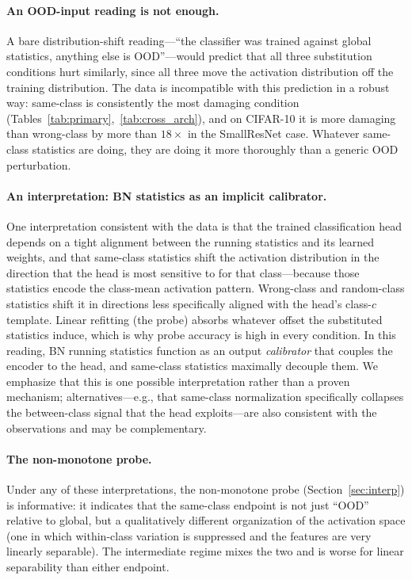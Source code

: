 \documentclass{article}
\begin{document}
\paragraph{An OOD-input reading is not enough.} A bare distribution-shift reading---``the classifier was trained against global statistics, anything else is OOD''---would predict that all three substitution conditions hurt similarly, since all three move the activation distribution off the training distribution. The data is incompatible with this prediction in a robust way: same-class is consistently the most damaging condition (Tables~\ref{tab:primary},~\ref{tab:cross_arch}), and on CIFAR-10 it is more damaging than wrong-class by more than $18\times$ in the SmallResNet case. Whatever same-class statistics are doing, they are doing it more thoroughly than a generic OOD perturbation.

\paragraph{An interpretation: BN statistics as an implicit calibrator.} One interpretation consistent with the data is that the trained classification head depends on a tight alignment between the running statistics and its learned weights, and that same-class statistics shift the activation distribution in the direction that the head is most sensitive to for that class---because those statistics encode the class-mean activation pattern. Wrong-class and random-class statistics shift it in directions less specifically aligned with the head's class-$c$ template. Linear refitting (the probe) absorbs whatever offset the substituted statistics induce, which is why probe accuracy is high in every condition. In this reading, BN running statistics function as an output \emph{calibrator} that couples the encoder to the head, and same-class statistics maximally decouple them. We emphasize that this is one possible interpretation rather than a proven mechanism; alternatives---e.g., that same-class normalization specifically collapses the between-class signal that the head exploits---are also consistent with the observations and may be complementary.

\paragraph{The non-monotone probe.} Under any of these interpretations, the non-monotone probe (Section~\ref{sec:interp}) is informative: it indicates that the same-class endpoint is not just ``OOD'' relative to global, but a qualitatively different organization of the activation space (one in which within-class variation is suppressed and the features are very linearly separable). The intermediate regime mixes the two and is worse for linear separability than either endpoint.
\end{document}
